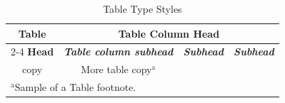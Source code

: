 \documentclass[conference]{IEEEtran}
\begin{document}




\begin{table}[htbp]
\caption{Table Type Styles}
\begin{center}
\begin{tabular}{|c|c|c|c|}
\hline
\textbf{Table}&\multicolumn{3}{|c|}{\textbf{Table Column Head}} \\
\cline{2-4} 
\textbf{Head} & \textbf{\textit{Table column subhead}}& \textbf{\textit{Subhead}}& \textbf{\textit{Subhead}} \\
\hline
copy& More table copy$^{\mathrm{a}}$& &  \\
\hline
\multicolumn{4}{l}{$^{\mathrm{a}}$Sample of a Table footnote.}
\end{tabular}
\label{tab1}
\end{center}
\end{table}
\end{document}
